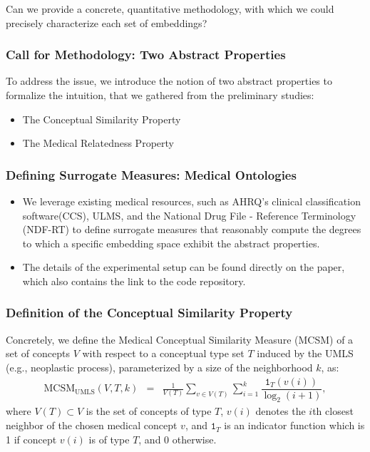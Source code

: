 \documentclass{beamer}
\begin{document}
\begin{frame}
\begin{center}
Can we provide a concrete, quantitative methodology,
with which we could precisely characterize each set of embeddings?
\end{center}
\end{frame}

\begin{frame}
\frametitle{Call for Methodology: Two Abstract 
Properties}
\begin{center}
To address the issue, we introduce the notion of
two abstract properties to formalize the
intuition, that we gathered from the preliminary 
studies:

\bigskip

\begin{itemize}
\item The Conceptual Similarity Property

\bigskip

\item The Medical Relatedness Property
\end{itemize}
\end{center}
\end{frame}

\begin{frame}
\frametitle{Defining Surrogate Measures: Medical
Ontologies}
\begin{itemize}
\item We leverage existing medical resources, such 
as AHRQ's clinical classification software(CCS),
ULMS, and the National Drug File - Reference
Terminology (NDF-RT) to define surrogate
measures that reasonably compute the degrees 
to which a specific embedding space exhibit the
abstract properties.

\bigskip
 
\item The details of the experimental setup can
be found directly on the paper, which also contains
the link to the code repository.

\end{itemize}
\end{frame}

\begin{frame}
\frametitle{Definition of the 
Conceptual Similarity Property}

Concretely, we define the Medical Conceptual Similarity Measure (MCSM) 
of a set of concepts $V$
with respect to a conceptual type set $T$ induced by the UMLS (e.g.,
neoplastic process), parameterized by 
a size of the neighborhood $k$, as: %
\begin{eqnarray*}
\text{MCSM}_{\text{UMLS}}(V,T,k) &=& \frac{1}{V(T)}\sum_{v \in V(T)} \sum_{i=1}^{k} \dfrac{ \mathtt{1}_{T}(v(i)) }{\log_2(i+1)},
\end{eqnarray*}
where $V(T)\subset V$ is the set of concepts of type $T$, $v(i)$ denotes the $i$th closest neighbor of the chosen medical concept $v$,
and $\mathtt{1}_{T}$ is an indicator function which is 1 if concept
$v(i)$ is of type $T$, and $0$ otherwise.
\end{frame}
\end{document}
